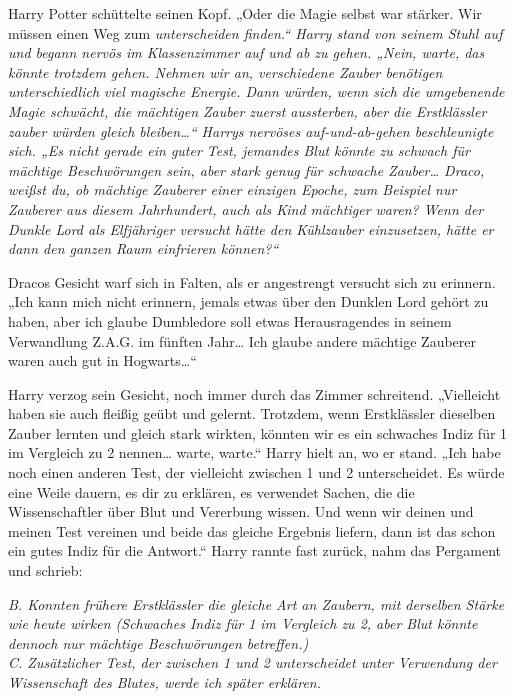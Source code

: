 {Harry Potter schüttelte seinen Kopf. „Oder die Magie selbst war stärker. Wir müssen einen Weg zum \emph{unterscheiden finden.“ Harry stand von seinem Stuhl auf und begann nervös im Klassenzimmer auf und ab zu gehen. „Nein, warte, das könnte trotzdem gehen. Nehmen wir an, verschiedene Zauber benötigen unterschiedlich viel magische Energie. Dann würden, wenn sich die umgebenende Magie schwächt, die mächtigen Zauber zuerst aussterben, aber die Erstklässler zauber würden gleich bleiben…“ Harrys nervöses auf-und-ab-gehen beschleunigte sich. „Es nicht gerade ein guter Test, jemandes Blut könnte zu schwach für mächtige Beschwörungen sein, aber stark genug für schwache Zauber… Draco, weißst du, ob mächtige Zauberer einer einzigen Epoche, zum Beispiel nur Zauberer aus diesem Jahrhundert, auch als Kind mächtiger waren? Wenn der Dunkle Lord als Elfjähriger versucht hätte den Kühlzauber einzusetzen, hätte er dann den ganzen Raum einfrieren können?“}

Dracos Gesicht warf sich in Falten, als er angestrengt versucht sich zu erinnern. „Ich kann mich nicht erinnern, jemals etwas über den Dunklen Lord gehört zu haben, aber ich glaube Dumbledore soll etwas Herausragendes in seinem Verwandlung Z.A.G. im fünften Jahr… Ich glaube andere mächtige Zauberer waren auch gut in Hogwarts…“

Harry verzog sein Gesicht, noch immer durch das Zimmer schreitend. „Vielleicht haben sie auch fleißig geübt und gelernt. Trotzdem, wenn Erstklässler dieselben Zauber lernten und gleich stark wirkten, könnten wir es ein schwaches Indiz für 1 im Vergleich zu 2 nennen… warte, warte.“ Harry hielt an, wo er stand. „Ich habe noch einen anderen Test, der vielleicht zwischen 1 und 2 unterscheidet. Es würde eine Weile dauern, es dir zu erklären, es verwendet Sachen, die die Wissenschaftler über Blut und Vererbung wissen. Und wenn wir deinen und meinen Test vereinen und beide das gleiche Ergebnis liefern, dann ist das schon ein gutes Indiz für die Antwort.“ Harry rannte fast zurück, nahm das Pergament und schrieb:

\emph{B. K\emph{onnten frühere Erstklässler die gleiche Art an Zaubern, mit derselben} \emph{Stärke wie heute} \emph{wirken} \emph{(Schwaches Indiz für 1 im Vergleich zu 2, aber Blut könnte dennoch nur mächtige Beschwörungen betreffen.)}}\\ \emph{C. Zusätzlicher Test, der zwischen 1 und 2 unterscheidet unter Verwendung der Wissenschaft des Blutes, werde ich später erklären.}

}
